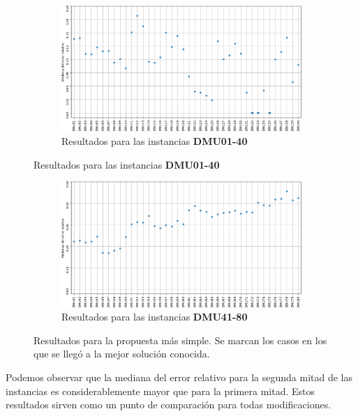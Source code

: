 \begin{figure}[H]
    \begin{subfigure}{\textwidth}
        \centering
        \includegraphics[scale=.65]{Imagenes/resn7ils1.png}
        \caption{Resultados para las instancias \textbf{DMU01-40}}
    \end{subfigure}
\end{figure}
\begin{figure}[H]\ContinuedFloat
    \begin{subfigure}{\textwidth}
        \centering
        \includegraphics[scale=.65]{Imagenes/resn7ils2.png}
        \caption{Resultados para las instancias \textbf{DMU41-80}}
    \end{subfigure}
    \caption{Resultados para la propuesta más simple. Se marcan los casos en los que se llegó a la mejor solución conocida.}
\end{figure}

Podemos observar que la mediana del error relativo para la segunda mitad de las instancias es considerablemente mayor que para la primera mitad. Estos resultados sirven como un punto de comparación para todas modificaciones.

